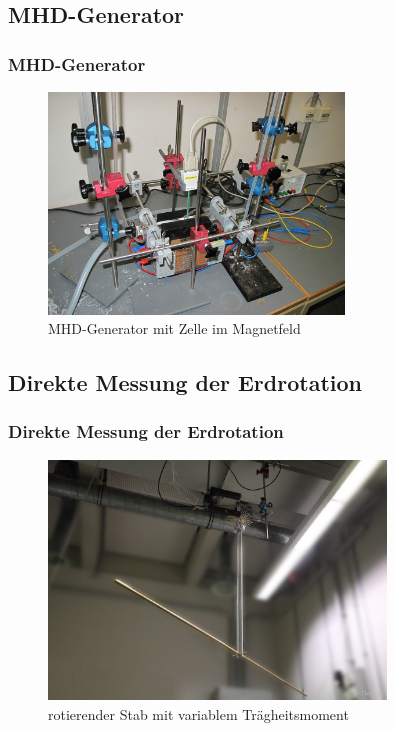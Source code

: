 \documentclass[10pt]{beamer}
\begin{document}
\subsection[]{MHD-Generator}
\frame
{
\frametitle{MHD-Generator}
\begin{figure}
\begin{center}
\includegraphics[width=0.7\textwidth]{./images/prIMG_3768.jpg}
\caption{MHD-Generator mit Zelle im Magnetfeld}
\end{center}
\end{figure}
}
\subsection[]{Direkte Messung der Erdrotation}
\frame
{
\frametitle{Direkte Messung der Erdrotation}
\begin{figure}
\begin{center}
\includegraphics[width=0.8\textwidth]{./images/stab-gauss.jpg}
\caption{rotierender Stab mit variablem Tr\"agheitsmoment}
\end{center}
\end{figure}
}
\end{document}

